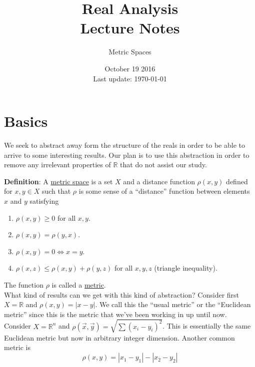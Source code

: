 \documentclass[12pt]{article}
\newlength\tindent
\renewcommand{\indent}{\hspace*{\tindent}}
\newcommand{\R}{\mathbb R}
\begin{document}
 
 
\title{Real Analysis\\Lecture Notes}
\author{Metric Spaces}
\date{October 19 2016 \\ Last update: \today{}}
\maketitle

\section{Basics}

\indent We seek to abstract away form the structure of the reals in order to be able to arrive to some interesting results. Our plan is to use this abstraction in order to remove any irrelevant properties of $\R$ that do not assist our study.

{\bf Definition}: A \underline{metric space} is a set $X$ and a distance function $\rho(x,y)$ defined for $x,y \in X$ such that $\rho$ is some sense of a ``distance'' function between elements $x$ and $y$ satisfying
\begin{enumerate}
	\item $\rho(x, y) \geq 0$ for all $x, y$.
	\item $\rho(x, y) = \rho(y, x)$.
	\item $\rho(x, y) = 0 \iff x = y$.
	\item $\rho(x, z) \leq \rho(x, y) + \rho(y, z)$ for all $x, y, z$ (triangle inequality).
\end{enumerate}

The function $\rho$ is called a \underline{metric}. \\

\indent What kind of results can we get with this kind of abstraction? Consider first $X = \R$ and $\rho(x, y) = |x - y|$. We call this the ``usual metric'' or the ``Euclidean metric'' since this is the metric that we've been working in up until now. Consider $X = \R^n$ and $\rho(\vec{x},\vec{y}) = \sqrt{\sum (x_i - y_i)^2}$. This is essentially the same Euclidean metric but now in arbitrary integer dimension. Another common metric is 
\begin{equation*}
	\rho(x, y) = |x_1 - y_1| - |x_2 - y_2|
\end{equation*}
\end{document}
